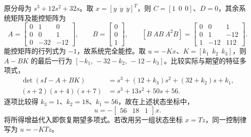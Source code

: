 

\sol 原分母为 $s^3+12s^2+32s$。取 $x=[y\ \ \dot y\ \ \ddot y]^T$，则 $C=[1\ \ 0\ \ 0]$、$D=0$，其余系统矩阵及能控矩阵为
\[
    A=\begin{bmatrix}0&1&0\\0&0&1\\0&-32&-12\end{bmatrix},\qquad
    B=\begin{bmatrix}0\\0\\1\end{bmatrix},\qquad
    [B\ AB\ A^2B]=\begin{bmatrix}
    0&0&1\\0&1&-12\\1&-12&112
    \end{bmatrix}.
\]
能控矩阵的行列式为 $-1$，故系统完全能控。取 $u=-Kx$、$K=[k_1\ \ k_2\ \ k_3]$，则 $A-BK$ 的最后一行为 $[-k_1,\,-32-k_2,\,-12-k_3]$。比较实际与期望的特征多项式，
\[
    \begin{aligned}
    \det(sI-A+BK)&=s^3+(12+k_3)s^2+(32+k_2)s+k_1,\\
    (s+2)(s+4)(s+7)&=s^3+13s^2+50s+56 .
    \end{aligned}
\]
逐项比较得 $k_3=1$、$k_2=18$、$k_1=56$，故在上述状态坐标中，
\[
    \boxed{u=-\begin{bmatrix}56&18&1\end{bmatrix}x.}
\]
将所得增益代入即恢复期望多项式。若改用另一组状态坐标 $x=Tz$，同一控制律写为 $u=-KTz$。
